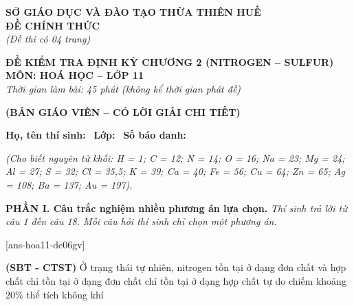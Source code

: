 \documentclass[12pt,a4paper]{article}
\begin{document}
\thispagestyle{firstpage}

\noindent
\begin{minipage}[t]{0.44\textwidth}
	\centering\fontsize{10pt}{12pt}\selectfont
	\textbf{SỞ GIÁO DỤC VÀ ĐÀO TẠO THỪA THIÊN HUẾ}\\
	\textbf{ĐỀ CHÍNH THỨC}\\
	\textit{(Đề thi có 04 trang)}
\end{minipage}\hfill
\begin{minipage}[t]{0.54\textwidth}
	\centering\small
	\textbf{ĐỀ KIỂM TRA ĐỊNH KỲ CHƯƠNG 2 (NITROGEN -- SULFUR)}\\
	\textbf{MÔN: HOÁ HỌC -- LỚP 11}\\
	\textit{Thời gian làm bài: 45 phút (không kể thời gian phát đề)}\\
\end{minipage}

\smallskip
\begin{center}
	{\color{hfRed}\textbf{\large (BẢN GIÁO VIÊN -- CÓ LỜI GIẢI CHI TIẾT)}}
\end{center}

\smallskip
\noindent\hrulefill
\smallskip

\noindent\textbf{Họ, tên thí sinh:} \dotfill\ \textbf{Lớp:} \dotfill\ \textbf{Số báo danh:} \dotfill

\smallskip
\noindent\textit{(Cho biết nguyên tử khối: H = 1; C = 12; N = 14; O = 16; Na = 23; Mg = 24; Al = 27; S = 32; Cl = 35,5; K = 39; Ca = 40; Fe = 56; Cu = 64; Zn = 65; Ag = 108; Ba = 137; Au = 197).}
\smallskip

\noindent\textbf{\large PHẦN I. Câu trắc nghiệm nhiều phương án lựa chọn.}
\textit{Thí sinh trả lời từ câu 1 đến câu 18. Mỗi câu hỏi thí sinh chỉ chọn một phương án.}
\vspace{0.2cm}

[ans-hoa11-de06gv]

\begin{ex}
\textbf{(SBT - CTST)} Ở trạng thái tự nhiên, nitrogen
\choice
{\True tồn tại ở dạng đơn chất và hợp chất}
{chỉ tồn tại ở dạng đơn chất}
{chỉ tồn tại ở dạng hợp chất}
{tự do chiếm khoảng 20\% thể tích không khí}

\end{ex}
\end{document}
